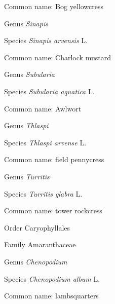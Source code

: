 \documentclass[9pt, article]{memoir}
\begin{document}
\begin{multicols}{2}
Common name: Bog yellowcress

\vspace{6pt}\noindent\hspace{30pt}Genus \textit{Sinapis}


\vspace{6pt}\noindent\hspace{36pt}Species \textit{Sinapis arvensis} L.


Common name: Charlock mustard

\vspace{6pt}\noindent\hspace{30pt}Genus \textit{Subularia}


\vspace{6pt}\noindent\hspace{36pt}Species \textit{Subularia aquatica} L.


Common name: Awlwort

\vspace{6pt}\noindent\hspace{30pt}Genus \textit{Thlaspi}


\vspace{6pt}\noindent\hspace{36pt}Species \textit{Thlaspi arvense} L.


Common name: field pennycress

\vspace{6pt}\noindent\hspace{30pt}Genus \textit{Turritis}


\vspace{6pt}\noindent\hspace{36pt}Species \textit{Turritis glabra} L.


Common name: tower rockcress

\vspace{6pt}\noindent\hspace{18pt}Order Caryophyllales


\vspace{6pt}\noindent\hspace{24pt}Family Amaranthaceae


\vspace{6pt}\noindent\hspace{30pt}Genus \textit{Chenopodium}


\vspace{6pt}\noindent\hspace{36pt}Species \textit{Chenopodium album} L.


Common name: lambsquarters


\end{multicols}
\end{document}
